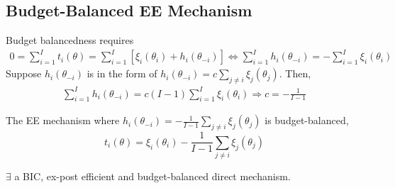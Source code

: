 \documentclass[11pt]{elegantbook_2}
\begin{document}
\subsection{Budget-Balanced EE Mechanism}
Budget balancedness requires
\begin{equation}
    \begin{aligned}
        0=\sum_{i=1}^I t_i(\theta)=\sum_{i=1}^I[\xi_i(\theta_i)+h_i(\theta_{-i})] \Leftrightarrow \sum_{i=1}^I h_i(\theta_{-i})=-\sum_{i=1}^I \xi_i(\theta_i)
    \end{aligned}
    \nonumber
\end{equation}
Suppose $h_i(\theta_{-i})$ is in the form of $h_i(\theta_{-i})=c\sum_{j\neq i} \xi_j(\theta_j)$. Then,
\begin{equation}
    \begin{aligned}
        \sum_{i=1}^I h_i(\theta_{-i})=c(I-1)\sum_{i=1}^I \xi_i(\theta_i) \Rightarrow c=-\frac{1}{I-1}
    \end{aligned}
    \nonumber
\end{equation}
\begin{proposition}
    The EE mechanism where $h_i(\theta_{-i})=-\frac{1}{I-1}\sum_{j\neq i} \xi_j(\theta_j)$ is budget-balanced, $$t_i(\theta)=\xi_i(\theta_i)-\frac{1}{I-1}\sum_{j\neq i} \xi_j(\theta_j)$$
\end{proposition}

\begin{corollary}
    $\exists$ a BIC, ex-post efficient and budget-balanced direct mechanism.
\end{corollary}
\end{document}
